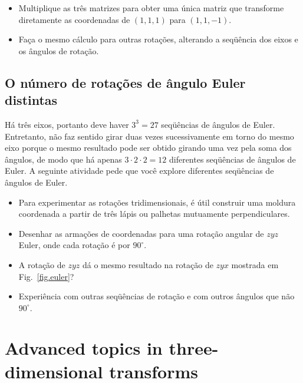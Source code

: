 \begin{framed}
\begin{itemize}
\item Multiplique as três matrizes para obter uma única matriz que transforme diretamente as coordenadas de $(1,1,1)$ para $(1,1,-1)$.
\item Faça o mesmo cálculo para outras rotações, alterando a seqüência dos eixos e os ângulos de rotação.
\end{itemize}
\end{framed}

\subsection{O número de rotações de ângulo Euler distintas}

Há três eixos, portanto deve haver $3^3=27$ seqüências de ângulos de Euler. Entretanto, não faz sentido girar duas vezes sucessivamente em torno do mesmo eixo porque o mesmo resultado pode ser obtido girando uma vez pela soma dos ângulos, de modo que há apenas $3\cdot 2\cdot 2=12$ diferentes seqüências de ângulos de Euler.  A seguinte atividade pede que você explore diferentes seqüências de ângulos de Euler.

\begin{framed}
\begin{itemize}
\item Para experimentar as rotações tridimensionais, é útil construir uma moldura coordenada a partir de três lápis ou palhetas mutuamente perpendiculares.
\item Desenhar as armações de coordenadas para uma rotação angular de $zyz$ Euler, onde cada rotação é por $90^\circ$. %
\item A rotação de $zyz$ dá o mesmo resultado na rotação de $zyx$ mostrada em Fig.~\ref{fig.euler}? %
\item Experiência com outras seqüências de rotação e com outros ângulos que não $90^\circ$.
\end{itemize}
\end{framed}

\section{Advanced topics in three-dimensional transforms}\label{s.advanced-three}

